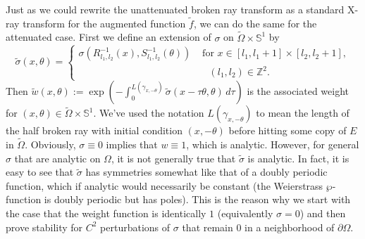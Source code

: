 \documentclass[10pt]{amsart}
\theoremstyle{definition}
\theoremstyle{definition}
\theoremstyle{definition}
\begin{document}
Just as we could rewrite the unattenuated broken ray transform as a standard X-ray transform for the augmented function $\widetilde{f}$, we can do the same for the attenuated case. First we define an extension of $\sigma$ on $\widetilde{\Omega}\times \mathbb{S}^{1}$ by
\begin{equation}
\widetilde{\sigma}(x,\theta) = \left\{ \begin{array}{ll}
\sigma( R_{l_{1},l_{2}}^{-1}(x), S_{l_{1},l_{2}}^{-1}(\theta)) & \textrm{ for }x \in [l_{1},l_{1}+1] \times [l_{2},l_{2}+1],\\
&  \quad (l_{1},l_{2}) \in \mathbb{Z}^{2}.
\end{array}\right.
\end{equation}
Then $\widetilde{w}(x,\theta) := \exp\left( -\int_{0}^{L(\gamma_{x,-\theta})}\widetilde{\sigma}(x-\tau\theta,\theta)\,d\tau\right)$ is the associated weight for $(x,\theta) \in \widetilde{\Omega} \times \mathbb{S}^{1}$. We've used the notation $L(\gamma_{x,-\theta})$ to mean the length of the half broken ray with initial condition $(x,-\theta)$ before hitting some copy of $E$ in $\widetilde{\Omega}$. Obviously, $\sigma \equiv 0$ implies that $w \equiv 1$, which is analytic. However, for general $\sigma$ that are analytic on $\Omega$, it is not generally true that $\widetilde{\sigma}$ is analytic. In fact, it is easy to see that $\widetilde{\sigma}$ has symmetries somewhat like that of a doubly periodic function, which if analytic would necessarily be constant (the Weierstrass $\wp$-function is doubly periodic but has poles). This is the reason why we start with the case that the weight function is identically $1$ (equivalently $\sigma = 0$) and then prove stability for $C^{2}$ perturbations of $\sigma$ that remain $0$ in a neighborhood of $\partial \Omega$.
\end{document}
